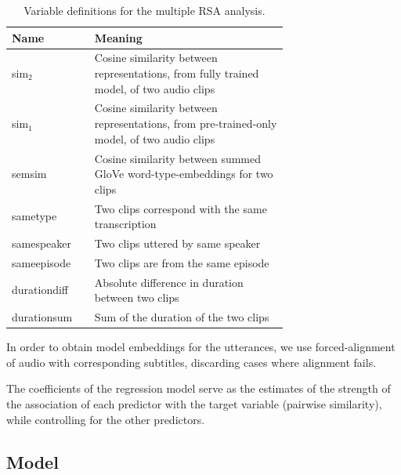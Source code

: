 \begin{table}
  \centering
  \begin{tabular}{lp{0.7\linewidth}}\toprule
    Name              & Meaning \\\midrule
    sim$_2$           & Cosine similarity between representations,
                        from fully trained model,
                        of two audio clips \\
    sim$_1$           & Cosine similarity between representations,
                        from pre-trained-only model,  of two audio
                        clips \\
    semsim            & Cosine similarity between summed GloVe word-type-embeddings for two clips\\
    sametype          & Two clips correspond with the same transcription \\
    samespeaker       & Two clips uttered by same speaker\\
    sameepisode       & Two clips are from the same episode\\
    durationdiff      & Absolute difference in duration between two
                        clips\\
    durationsum       & Sum of the duration of the two clips\\
  \end{tabular}
  \caption{Variable definitions for the multiple RSA analysis.}
  \label{tab:grsa-variables}
\end{table}

 In order to obtain model embeddings
for the utterances, we use forced-alignment of audio with
corresponding subtitles, discarding cases where alignment fails.

The coefficients of the regression model serve as the estimates of the
strength of the association of each predictor with the target variable
(pairwise similarity), while controlling for the other predictors. 


\subsection{Model}

